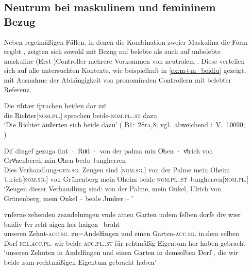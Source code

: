 \subsection{Neutrum bei maskulinem und femininem Bezug}
\label{subsec:m+m_anim_beidiu}

Neben regelmäßigen Fällen, in denen die Kombination zweier Maskulina die Form
 ergibt%
, zeigten sich sowohl mit Bezug auf belebte als auch auf unbelebte maskuline
(Erst-)Controller mehrere Vorkommen von neutralem . Diese
verteilen sich auf alle untersuchten Kontexte, wie beispielhaft in
\cref{ex:m+m_beidiu} gezeigt, mit Ausnahme der Abhängigkeit von pronominalen
Controllern mit belebter Referenz.

\begin{exe}
\ex \label{ex:m+m_beidiu}
	\begin{xlist}
	\ex \label{ex:m+m_beidiu_1}
		\gll Die rihtær ſprachen beideu {dar zuͦ} \\
			die Richter[\textsc{nom.pl.\MascM}] sprachen
			beide-\textsc{nom.pl.\NeutM.st} dazu \\
		\trans `Die Richter äußerten sich beide dazu'
			(%
				B1:~28ra,8; vgl.~abweichend
				\KC:~V.~10090;
				\citet[267]{schroeder1895}%
			)

	\ex \label{ex:m+m_beidiu_3}
		\gll Diſ dingeſ gezuga ſint · Ruͦd · von der palma
				min Oͤhen · vͦlrich von Grvͤnenberch min Oͤhen
				bedu Jungherren
				\textelp{} \\
			Dies Verhandlung-\textsc{gen.sg.\NeutI} Zeugen sind {}
				[\textsc{nom.sg.\MascM}] {} von der Palme mein Oheim
				{} Ulrich[\textsc{nom.sg.\MascM}] von Grünenberg mein Oheim
				beide-\textsc{nom.pl.\NeutM.st}
				Jungherren[\textsc{nom.pl.\MascM}] {} \\
		\trans `Zeugen dieser Verhandlung sind:  von der Palme,
			mein Onkel, Ulrich von Grünenberg, mein Onkel -- beide Junker --
			\textelp{}'
			\parencites(Nr.~2915, Kl.~St.~Urban, Kt.~Luzern, 1298)[213,33--35]{cao4}

	\ex \label{ex:m+m_beidiu_5}
		\gll vnſerne zehenden zeandeluingen vnde
				ainen Garten indem ſelben dorfe \textelp{}
				div wier baidiv fvr reht aigen her
				haigen~ braht \\
			unseren Zehnt-\textsc{acc.sg.\MascI} zu=Andelfingen und einen
				Garten-\textsc{acc.sg.\MascI} in.dem selben Dorf {}
				\textsc{rel.acc.pl.\NeutI} wir beide-\textsc{acc.pl.\NeutI.st}
				für rehtmäßig Eigentum her haben gebracht \\
		\trans `unseren Zehnten in Andelfingen und einen Garten in
			demselben Dorf \textelp{}, die wir beide zum rechtmäßigen Eigentum
			gebracht haben'
			\parencites(Nrn.~1201~AB, Kl.~Heiligkreuztal, Kr.~Biberach, 1290)[472,10--14]{cao2}
	\end{xlist}
\end{exe}

